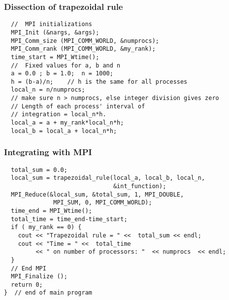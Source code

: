 \documentclass{beamer}
\begin{document}
\begin{frame}
\frametitle{Dissection of trapezoidal rule}

\begin{block}{}
















\begin{verbatim}
  //  MPI initializations
  MPI_Init (&nargs, &args);
  MPI_Comm_size (MPI_COMM_WORLD, &numprocs);
  MPI_Comm_rank (MPI_COMM_WORLD, &my_rank);
  time_start = MPI_Wtime();
  //  Fixed values for a, b and n 
  a = 0.0 ; b = 1.0;  n = 1000;
  h = (b-a)/n;    // h is the same for all processes 
  local_n = n/numprocs;  
  // make sure n > numprocs, else integer division gives zero
  // Length of each process' interval of
  // integration = local_n*h.  
  local_a = a + my_rank*local_n*h;
  local_b = local_a + local_n*h;

\end{verbatim}


\end{block}
\end{frame}

\begin{frame}
\frametitle{Integrating with \textbf{MPI}}

\begin{block}{}


















\begin{verbatim}
  total_sum = 0.0;
  local_sum = trapezoidal_rule(local_a, local_b, local_n, 
                               &int_function); 
  MPI_Reduce(&local_sum, &total_sum, 1, MPI_DOUBLE, 
              MPI_SUM, 0, MPI_COMM_WORLD);
  time_end = MPI_Wtime();
  total_time = time_end-time_start;
  if ( my_rank == 0) {
    cout << "Trapezoidal rule = " <<  total_sum << endl;
    cout << "Time = " <<  total_time  
         << " on number of processors: "  << numprocs  << endl;
  }
  // End MPI
  MPI_Finalize ();  
  return 0;
}  // end of main program

\end{verbatim}


\end{block}
\end{frame}
\end{document}
